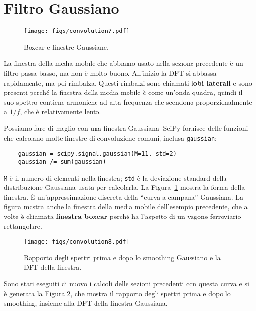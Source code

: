 \documentclass[12pt]{book} \usepackage[width=5.5in,height=8.5in, hmarginratio=3:2,vmarginratio=1:1]{geometry}
\begin{document}
\section{Filtro Gaussiano} 

\begin{figure} 

\centerline{\texttt{[image: figs/convolution7.pdf]}} \caption{Boxcar e finestre Gaussiane.} \label{fig.convolution7} \end{figure} 

La finestra della media mobile che abbiamo usato nella sezione precedente è un filtro passa-basso, ma non è molto buono. All'inizio la DFT si abbassa rapidamente, ma poi rimbalza. Questi rimbalzi sono chiamati {\bf lobi laterali} e sono presenti perché la finestra della media mobile è come un'onda quadra, quindi il suo spettro contiene armoniche ad alta frequenza che scendono proporzionalmente a $1/f$, che è relativamente lento.

Possiamo fare di meglio con una finestra Gaussiana. SciPy fornisce delle funzioni che calcolano molte finestre di convoluzione comuni, inclusa {\tt gaussian}:

\begin{verbatim} 
    gaussian = scipy.signal.gaussian(M=11, std=2)
    gaussian /= sum(gaussian)
 \end{verbatim} 

{\tt M} è il numero di elementi nella finestra; {\tt std} è la deviazione standard della distribuzione Gaussiana usata per calcolarla. La Figura~\ref{fig.convolution7} mostra la forma della finestra. È un'approssimazione discreta della ``curva a campana'' Gaussiana. La figura mostra anche la finestra della media mobile dell'esempio precedente, che a volte è chiamata {\bf finestra boxcar} perché ha l'aspetto di un vagone ferroviario rettangolare.

\begin{figure} 

\centerline{\texttt{[image: figs/convolution8.pdf]}} \caption{Rapporto degli spettri prima e dopo lo smoothing Gaussiano e la DFT della finestra.} \label{fig.convolution8} \end{figure} 

Sono stati eseguiti di nuovo i calcoli delle sezioni precedenti con questa curva e si è generata la Figura \ref{fig.convolution8}, che mostra il rapporto degli spettri prima e dopo lo smoothing, insieme alla DFT della finestra Gaussiana.
\end{document}
